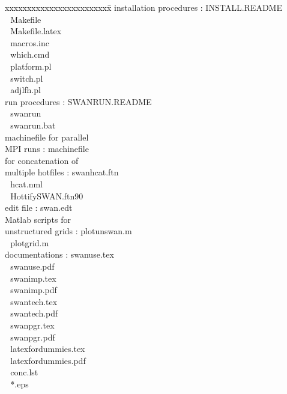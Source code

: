 \documentclass[12pt]{book}
\begin{document}
\begin{tabbing}
xxxxxxxxxxxxxxxxxxxxxxxx\= \kill
installation procedures   \>:       INSTALL.README \\
                          \> $\,\,$ Makefile \\
                          \> $\,\,$ Makefile.latex \\
                          \> $\,\,$ macros.inc \\
                          \> $\,\,$ which.cmd \\
                          \> $\,\,$ platform.pl \\
                          \> $\,\,$ switch.pl \\
                          \> $\,\,$ adjlfh.pl \\
run procedures            \>:       SWANRUN.README \\
                          \> $\,\,$ swanrun \\
                          \> $\,\,$ swanrun.bat \\
machinefile for parallel  \> $\,\,$ \\
MPI runs                  \>:       machinefile \\
for concatenation of      \> $\,\,$ \\
multiple hotfiles         \>:       swanhcat.ftn \\
                          \> $\,\,$ hcat.nml \\
                          \> $\,\,$ HottifySWAN.ftn90 \\
edit file                 \>:       swan.edt \\
Matlab scripts for        \> $\,\,$ \\
unstructured grids        \>:       plotunswan.m \\
                          \> $\,\,$ plotgrid.m \\
documentations            \>:       swanuse.tex \\
                          \> $\,\,$ swanuse.pdf \\
                          \> $\,\,$ swanimp.tex \\
                          \> $\,\,$ swanimp.pdf \\
                          \> $\,\,$ swantech.tex \\
                          \> $\,\,$ swantech.pdf \\
                          \> $\,\,$ swanpgr.tex \\
                          \> $\,\,$ swanpgr.pdf \\
                          \> $\,\,$ latexfordummies.tex \\
                          \> $\,\,$ latexfordummies.pdf \\
                          \> $\,\,$ conc.lst \\
                          \> $\,\,$ *.eps \\
\end{tabbing}
\end{document}
